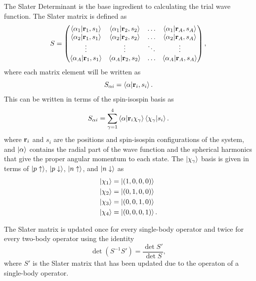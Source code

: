 The Slater Determinant is the base ingredient to calculating the trial wave function. The Slater matrix is defined as
\begin{equation}
   S = \begin{pmatrix}
      \left< \alpha_1 | \mathbf{r}_1,s_1 \right> & \left< \alpha_1 | \mathbf{r}_2,s_2 \right> & \ldots & \left< \alpha_1 | \mathbf{r}_A,s_A \right> \\
      \left< \alpha_2 | \mathbf{r}_1,s_1 \right> & \left< \alpha_2 | \mathbf{r}_2,s_2 \right> & \ldots & \left< \alpha_2 | \mathbf{r}_A,s_A \right> \\
      \vdots & \vdots & \ddots & \vdots \\
      \left< \alpha_A | \mathbf{r}_1,s_1 \right> & \left< \alpha_A | \mathbf{r}_2,s_2 \right> & \ldots & \left< \alpha_A | \mathbf{r}_A,s_A \right>
   \end{pmatrix},
\end{equation}
where each matrix element will be written as
\begin{equation}
   S_{\alpha i} = \left< \alpha | \mathbf{r}_i,s_i \right>.
\end{equation}
This can be written in terms of the spin-isospin basis as
\begin{equation}
   S_{\alpha i} = \sum\limits_{\gamma=1}^4 \left< \alpha | \mathbf{r}_i \chi_\gamma \right>\left< \chi_\gamma | s_i \right>.
\end{equation}
where $\mathbf{r}_i$ and $s_i$ are the positions and spin-isospin configurations of the system, and $\left| \alpha \right>$ contains the radial part of the wave function and the spherical harmonics that give the proper angular momentum to each state. The $\left| \chi_\gamma \right>$ basis is given in terms of $\left| p\uparrow \right>$, $\left| p\downarrow \right>$, $\left| n\uparrow \right>$, and $\left| n\downarrow \right>$ as
\begin{equation}
\begin{split}
   \left| \chi_1 \right> &= \left| \left(1,0,0,0\right) \right> \\
   \left| \chi_2 \right> &= \left| \left(0,1,0,0\right) \right> \\
   \left| \chi_3 \right> &= \left| \left(0,0,1,0\right) \right> \\
   \left| \chi_4 \right> &= \left| \left(0,0,0,1\right) \right>.
\end{split}
\end{equation}

The Slater matrix is updated once for every single-body operator and twice for every two-body operator using the identity
\begin{equation}
   \det{\left(S^{-1}S'\right)} = \frac{\det{S'}}{\det S},
   \label{equ:matrixid}
\end{equation}
where $S'$ is the Slater matrix that has been updated due to the operaton of a single-body operator.

